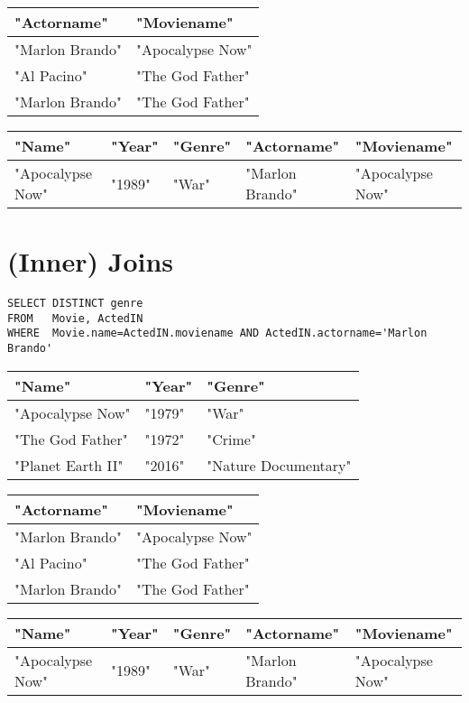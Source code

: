 \documentclass{article}
\begin{document}
\begin{tabular}{ll}
\hline
"Actorname" & "Moviename" \\
\hline
"Marlon Brando" & "Apocalypse Now" \\
"Al Pacino" & "The God Father" \\
"Marlon Brando" & "The God Father" \\
\hline
\end{tabular}

\begin{tabular}{lllll}
\hline
"Name" & "Year" & "Genre" & "Actorname" & "Moviename" \\
\hline
"Apocalypse Now" & "1989" & "War" & "Marlon Brando" & "Apocalypse Now" \\
\hline
\end{tabular}

\section*{(Inner) Joins}
\begin{verbatim}
SELECT DISTINCT genre
FROM   Movie, ActedIN
WHERE  Movie.name=ActedIN.moviename AND ActedIN.actorname='Marlon Brando'
\end{verbatim}

\begin{tabular}{lll}
\hline
"Name" & "Year" & "Genre" \\
\hline
"Apocalypse Now" & "1979" & "War" \\
"The God Father" & "1972" & "Crime" \\
"Planet Earth II" & "2016" & "Nature Documentary" \\
\hline
\end{tabular}

\begin{tabular}{ll}
\hline
"Actorname" & "Moviename" \\
\hline
"Marlon Brando" & "Apocalypse Now" \\
"Al Pacino" & "The God Father" \\
"Marlon Brando" & "The God Father" \\
\hline
\end{tabular}

\begin{tabular}{lllll}
\hline
"Name" & "Year" & "Genre" & "Actorname" & "Moviename" \\
\hline
"Apocalypse Now" & "1989" & "War" & "Marlon Brando" & "Apocalypse Now" \\
\hline
\end{tabular}
\end{document}
